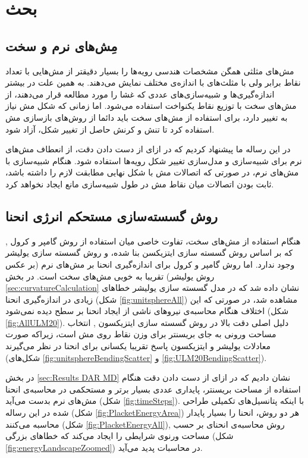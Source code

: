 \setRL
\clearpage

\section{
بحث
}
\subsection{مِش‌های نرم و سخت}
مش‌های مثلثی همگن مشخصات هندسی رویه‌ها را بسیار دقیقتر از مش‌هایی با تعداد نقاط برابر ولی با مثلث‌‌های با اندازه‌ی مختلف نمایش می‌دهند. به همین علت در بیشتر اندازه‌گیری‌ها و شبیه‌سازی‌های عددی که غشا را مورد مطالعه قرار می‌دهند، از مش‌های سخت با توزیع نقاط یکنواخت استفاده می‌شود. اما زمانی‌ که شکل مش‌ نیاز به تغییر دارد، برای استفاده از مش‌های سخت باید دائما از روش‌های بازسازی مش استفاده کرد تا تنش و کرنش حاصل از تغییر شکل، آزاد شود.

در این رساله ما پیشنهاد کردیم که در ازای از دست دادن دقت، از انعطاف مش‌های نرم برای شبیه‌سازی و مدل‌سازی تغییر شکل‌ رویه‌ها استفاده شود. هنگام شبیه‌سازی با مش‌های نرم، در صورتی که اتصالات مش با شکل‌ نهایی مطابقت لازم را داشته باشد، ثابت بودن اتصالات میان نقاط مش در طول شبیه‌سازی مانع ایجاد نخواهد کرد.

\subsection{
روش گسسته‌سازی مستحکم انرژی انحنا
}
هنگام استفاده از مش‌های سخت، تفاوت خاصی میان استفاده از روش گامپر و کرول
\cite{gompper1996},
که بر اساس روش گسسته سازی ایتزیکسن 
\cite{Itzykson1986}
بنا شده، و روش گسسته سازی یولیشر
\cite{Julicher1996}
وجود ندارد. اما روش گامپر و کرول برای اندازه‌گیری انحنا بر مش‌های نرم (بر عکس روش یولیشر) تقریبا به خوبی مش‌های سخت است. در بخش 
\ref{sec:curvatureCalculation}
نشان داده شد که در مدل گسسته سازی یولیشر خطا‌های زیادی در اندازه‌گیری انحنا (شکل
\ref{fig:unitsphereAll})
مشاهده شد، در صورتی که این اختلاف هنگام محاسبه‌ی نیرو‌های ناشی از ایجاد انحنا بر سطح دیده نمی‌شود (شکل
\ref{fig:AllULM20}).
  دلیل اصلی دقت بالا در روش گسسته سازی ایتزیکسون
\cite{Itzykson1986},
انتخاب مساحت ورونی به جای بریسنتر برای وزن نقاط روی مش است، زیراکه صورت معادلات یولیشر و ایتزیکسون پاسخ تقریبا یکسانی برای انحنا در نظر می‌گیرند (شکل‌های
\ref{fig:unitsphereBendingScatter}
و
\ref{fig:ULM20BendingScatter}).

در بخش
\ref{sec:Results DAR MD}
نشان دادیم که در ازای از دست دادن دقت هنگام استفاده از مساحت بریسنتر، پایداری عددی بسیار برتر و مستحکمی در محاسبه‌ی انحنا مش‌های نرم بدست می‌آید (شکل
\ref{fig:timeSteps}).
با اینکه پتانسیل‌های تکمیلی طراحی شده در این رساله (شکل
\ref{fig:PlacketEnergyArea})
هر دو روش،  انحنا را بسیار پایدار محاسبه می‌کنند (شکل
\ref{fig:PlacketEnergyAll}),
 روش محاسبه‌ی انحنای بر حسب مساحت ورنوی شرایطی را ایجاد می‌کند که خطا‌های بزرگی (شکل
\ref{fig:energyLandscapeZoomed})
 در محاسبات پدید می‌آید.

